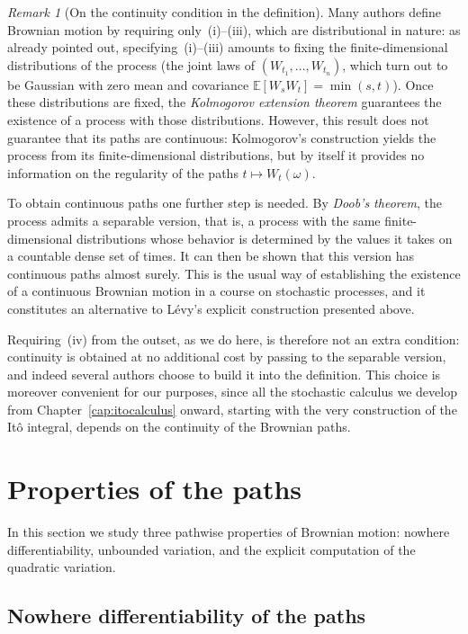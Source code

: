 \documentclass[11pt,a4paper,oneside]{report}
\theoremstyle{plain}
\theoremstyle{definition}
\theoremstyle{remark}
\newtheorem{observacion}[teorema]{Remark}
\newcommand{\E}{\mathbb{E}}
\newcommand{\1}{\mathbf{1}}
\begin{document}
\begin{observacion}[On the continuity condition in the definition]
\label{obs:continuidad_definicion}
Many authors define Brownian motion by requiring only~(i)--(iii),
which are distributional in nature: as already pointed out,
specifying~(i)--(iii) amounts to fixing the finite-dimensional
distributions of the process (the joint laws of
$(W_{t_1}, \dots, W_{t_n})$, which turn out to be Gaussian with zero
mean and covariance $\E[W_s W_t] = \min(s, t)$). Once these
distributions are fixed, the \emph{Kolmogorov extension theorem}
guarantees the existence of a process with those distributions.
However, this result does not guarantee that its paths are
continuous: Kolmogorov's construction yields the process from its
finite-dimensional distributions, but by itself it provides no
information on the regularity of the paths $t \mapsto W_t(\omega)$.

To obtain continuous paths one further step is needed. By
\emph{Doob's theorem}, the process admits a separable version, that
is, a process with the same finite-dimensional distributions whose
behavior is determined by the values it takes on a countable dense set
of times. It can then be shown that this version has continuous paths
almost surely. This is the usual way of establishing the existence of
a continuous Brownian motion in a course on stochastic processes, and
it constitutes an alternative to Lévy's explicit construction
presented above.

Requiring~(iv) from the outset, as we do here, is therefore not an
extra condition: continuity is obtained at no additional cost by
passing to the separable version, and indeed several authors choose
to build it into the definition. This choice is moreover convenient
for our purposes, since all the stochastic calculus we develop from
Chapter~\ref{cap:itocalculus} onward, starting with the very
construction of the Itô integral, depends on the continuity of the
Brownian paths.
\end{observacion}

\section{Properties of the paths}
\label{sec:propiedades_brown}

In this section we study three pathwise properties of Brownian
motion: nowhere differentiability, unbounded variation, and the
explicit computation of the quadratic variation.

\subsection{Nowhere differentiability of the paths}
\label{subsec:no_diferenciabilidad}
\end{document}
